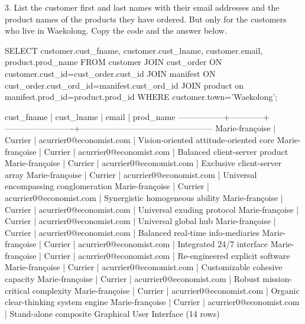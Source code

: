 3. List the customer first and last names with their email addresses and the product names of the products they have ordered. But only for the customers who live in Waekolong. Copy the code and the answer below.
\begin{sql}
SELECT customer.cust_fname, customer.cust_lname, customer.email, product.prod_name FROM customer
JOIN cust_order ON customer.cust_id=cust_order.cust_id
JOIN manifest ON cust_order.cust_ord_id=manifest.cust_ord_id
JOIN product on manifest.prod_id=product.prod_id
WHERE customer.town='Waekolong';
\end{sql}
\begin{pseudo*}
   cust_fname    | cust_lname |          email          |                   prod_name
-----------------+------------+-------------------------+------------------------------------------------        
 Marie-françoise | Currier    | acurrier0@economist.com | Vision-oriented attitude-oriented core
 Marie-françoise | Currier    | acurrier0@economist.com | Balanced client-server product
 Marie-françoise | Currier    | acurrier0@economist.com | Exclusive client-server array
 Marie-françoise | Currier    | acurrier0@economist.com | Universal encompassing conglomeration
 Marie-françoise | Currier    | acurrier0@economist.com | Synergistic homogeneous ability
 Marie-françoise | Currier    | acurrier0@economist.com | Universal exuding protocol
 Marie-françoise | Currier    | acurrier0@economist.com | Universal global hub
 Marie-françoise | Currier    | acurrier0@economist.com | Balanced real-time info-mediaries
 Marie-françoise | Currier    | acurrier0@economist.com | Integrated 24/7 interface
 Marie-françoise | Currier    | acurrier0@economist.com | Re-engineered explicit software
 Marie-françoise | Currier    | acurrier0@economist.com | Customizable cohesive capacity
 Marie-françoise | Currier    | acurrier0@economist.com | Robust mission-critical complexity
 Marie-françoise | Currier    | acurrier0@economist.com | Organic clear-thinking system engine
 Marie-françoise | Currier    | acurrier0@economist.com | Stand-alone composite Graphical User Interface
(14 rows)
\end{pseudo*}


